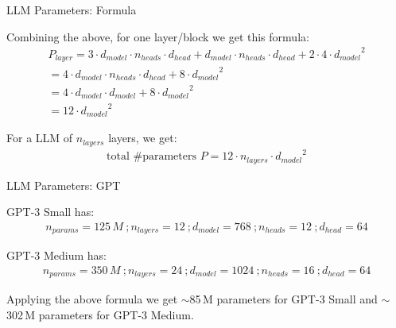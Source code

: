 
\begin{vbframe}{LLM Parameters: Formula}

\vfill

Combining the above, for one layer/block we get this formula:
\begin{equation*}
\begin{array}{c}
P_{layer} = 3 \cdot d_{model} \cdot n_{heads} \cdot d_{head} + d_{model} \cdot n_{heads} \cdot d_{head} + 2 \cdot 4 \cdot {d_{model}}^2 \\ [8pt]
 = 4 \cdot d_{model} \cdot n_{heads} \cdot d_{head} + 8 \cdot {d_{model}}^2 \\ [8pt]
 = 4 \cdot d_{model} \cdot d_{model} + 8 \cdot {d_{model}}^2 \\ [8pt]
 = 12 \cdot {d_{model}}^2
\end{array}
\end{equation*}

\vskip5mm

For a LLM of $n_{layers}$ layers, we get:
\begin{equation*}
\begin{array}{c}
\mbox{total \# parameters\ \ } P = 12 \cdot n_{layers} \cdot {d_{model}}^2
\end{array}
\end{equation*}

\vfill

\end{vbframe}


\begin{vbframe}{LLM Parameters: GPT}

\vfill

GPT-3 Small has:
\begin{equation*}
\begin{array}{l}
n_{params} = 125\,M ~; n_{layers} = 12 ~; d_{model} = 768 ~; n_{heads} = 12 ~; d_{head} = 64 
\end{array}
\end{equation*}

\vskip2mm

GPT-3 Medium has:
\begin{equation*}
\begin{array}{l}
n_{params} = 350\,M ~; n_{layers} = 24 ~; d_{model} = 1024 ~; n_{heads} = 16 ~; d_{head} = 64 
\end{array}
\end{equation*}

\vskip2mm

Applying the above formula we get $\sim$85\,M parameters for GPT-3 Small and $\sim$302\,M parameters for GPT-3 Medium. 



\vfill

\end{vbframe}


